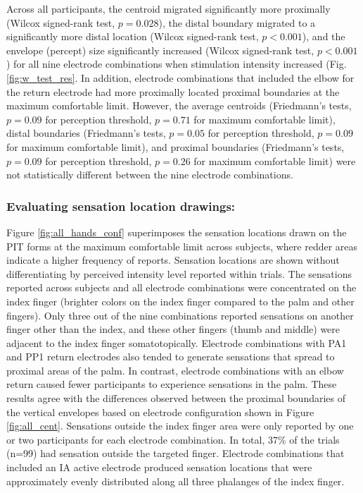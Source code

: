 \documentclass[10pt]{iopart}
\begin{document}
Across all participants, the centroid migrated significantly more proximally (Wilcox signed-rank test, $p=0.028$), the distal boundary migrated to a significantly more distal location (Wilcox signed-rank test, $p<0.001$), and the envelope (percept) size significantly increased (Wilcox signed-rank test, $p<0.001$) for all nine electrode combinations when stimulation intensity increased (Fig. \ref{fig:w_test_res}. In addition, electrode combinations that included the elbow for the return electrode had more proximally located proximal boundaries at the maximum comfortable limit. However, the average centroids (Friedmann's tests, $p=0.09$ for perception threshold, $p=0.71$ for maximum comfortable limit), distal boundaries (Friedmann's tests, $p=0.05$ for perception threshold, $p=0.09$ for maximum comfortable limit), and proximal boundaries (Friedmann's tests, $p=0.09$ for perception threshold, $p=0.26$ for maximum comfortable limit) were not statistically different between the nine electrode combinations.

\subsubsection{Evaluating sensation location drawings:}
Figure \ref{fig:all_hands_conf} superimposes the sensation locations drawn on the PIT forms at the maximum comfortable limit across subjects, where redder areas indicate a higher frequency of reports. Sensation locations are shown without differentiating by perceived intensity level reported within trials. The sensations reported across subjects and all electrode combinations were concentrated on the index finger (brighter colors on the index finger compared to the palm and other fingers). Only three out of the nine combinations reported sensations on another finger other than the index, and these other fingers (thumb and middle) were adjacent to the index finger somatotopically. Electrode combinations with PA1 and PP1 return electrodes also tended to generate sensations that spread to proximal areas of the palm. In contrast, electrode combinations with an elbow return caused fewer participants to experience sensations in the palm. These results agree with the differences observed between the proximal boundaries of the vertical envelopes based on electrode configuration shown in Figure \ref{fig:all_cent}. Sensations outside the index finger area were only reported by one or two participants for each electrode combination. In total, 37\% of the trials (n=99) had sensation outside the targeted finger. Electrode combinations that included an IA active electrode produced sensation locations that were approximately evenly distributed along all three phalanges of the index finger. 
\end{document}
